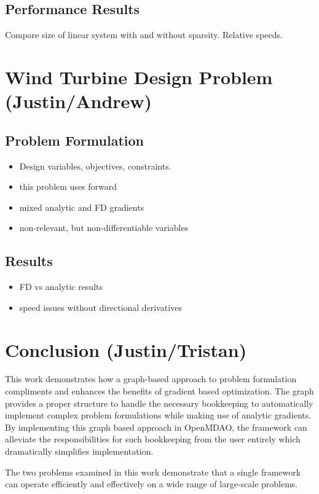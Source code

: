 \documentclass[]{aiaa-tc} %
\begin{document}
        \subsection{Performance Results}
            Compare size of linear system with and without sparsity. Relative speeds. 


  \section{Wind Turbine Design Problem (Justin/Andrew)}
    \subsection{Problem Formulation}
        \begin{itemize}
            \item Design variables, objectives, constraints. 
            \item this problem uses forward
            \item mixed analytic and FD gradients
            \item non-relevant, but non-differentiable variables 
        \end{itemize}

    \subsection{Results}
        \begin{itemize}
            \item FD vs analytic results
            \item speed issues without directional derivatives
        \end{itemize}
     

  \section{Conclusion (Justin/Tristan)}

      This work demonstrates how a graph-based approach to problem formulation compliments and enhances the benefits of gradient based
      optimization. The graph provides a proper structure to handle the necessary bookkeeping to automatically implement complex 
      problem formulations while making use of analytic gradients. By implementing this graph based approach in OpenMDAO, the framework 
      can alleviate the responsibilities for such bookkeeping from the user entirely which dramatically simplifies implementation. 

      The two problems examined in this work demonstrate that a single framework can operate efficiently and effectively on a wide range 
      of large-scale problems. 

  
\end{document}
